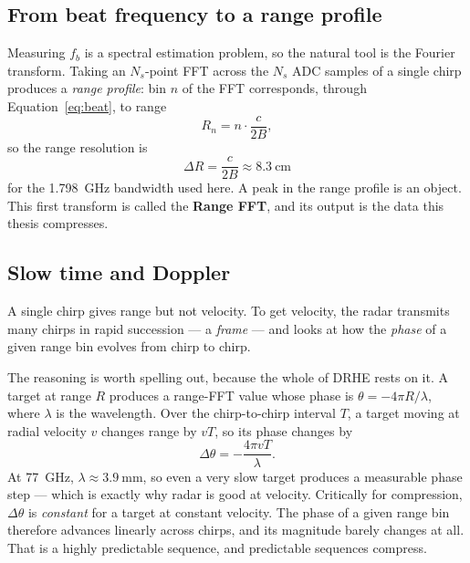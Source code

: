 \subsection{From beat frequency to a range profile}

Measuring $f_b$ is a spectral estimation problem, so the natural tool is the
Fourier transform. Taking an $N_s$-point FFT across the $N_s$ ADC samples of a
single chirp produces a \emph{range profile}: bin $n$ of the FFT corresponds,
through Equation~\eqref{eq:beat}, to range
\begin{equation}
R_n = n \cdot \frac{c}{2B},
\end{equation}
so the range resolution is
\begin{equation}
\Delta R = \frac{c}{2B} \approx \SI{8.3}{\centi\metre}
\end{equation}
for the \SI{1.798}{\giga\hertz} bandwidth used here. A peak in the range
profile is an object. This first transform is called the \textbf{Range FFT},
and its output is the data this thesis compresses.

\subsection{Slow time and Doppler}

A single chirp gives range but not velocity. To get velocity, the radar
transmits many chirps in rapid succession --- a \emph{frame} --- and looks at
how the \emph{phase} of a given range bin evolves from chirp to chirp.

The reasoning is worth spelling out, because the whole of DRHE rests on it. A
target at range $R$ produces a range-FFT value whose phase is
$\theta = -4\pi R/\lambda$, where $\lambda$ is the wavelength. Over the
chirp-to-chirp interval $T$, a target moving at radial velocity $v$ changes
range by $vT$, so its phase changes by
\begin{equation}
\label{eq:dopplerphase}
\Delta\theta = -\frac{4\pi v T}{\lambda}.
\end{equation}
At \SI{77}{\giga\hertz}, $\lambda \approx \SI{3.9}{\milli\metre}$, so even a
very slow target produces a measurable phase step --- which is exactly why
radar is good at velocity. Critically for compression, $\Delta\theta$ is
\emph{constant} for a target at constant velocity. The phase of a given range
bin therefore advances linearly across chirps, and its magnitude barely changes
at all. That is a highly predictable sequence, and predictable sequences
compress.

